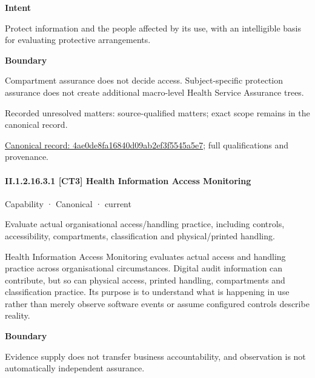 \textbf{Intent}



Protect information and the people affected by its use, with an intelligible basis for evaluating protective arrangements.



\textbf{Boundary}



Compartment assurance does not decide access. Subject-specific protection assurance does not create additional macro-level Health Service Assurance trees.


{\small Recorded unresolved matters: source-qualified matters; exact scope remains in the canonical record.}\par
{\footnotesize \href{../../../../continuum/strategy/capability/4ae0de8fa16840d09ab2ef3f5545a5e7.md}{Canonical record: 4ae0de8fa16840d09ab2ef3f5545a5e7}; full qualifications and provenance.}\par
\paragraph*{II.1.2.16.3.1 [CT3] Health Information Access Monitoring}
\label{navigation:II.1.2.16.3.1}

\label{element:01854c7311404bbf9f698fce4656b54d}
{\small Capability · Canonical · current}\par

Evaluate actual organisational access/handling practice, including controls, accessibility, compartments, classification and physical/printed handling.



Health Information Access Monitoring evaluates actual access and handling practice across organisational circumstances. Digital audit information can contribute, but so can physical access, printed handling, compartments and classification practice. Its purpose is to understand what is happening in use rather than merely observe software events or assume configured controls describe reality.



\textbf{Boundary}



Evidence supply does not transfer business accountability, and observation is not automatically independent assurance.


